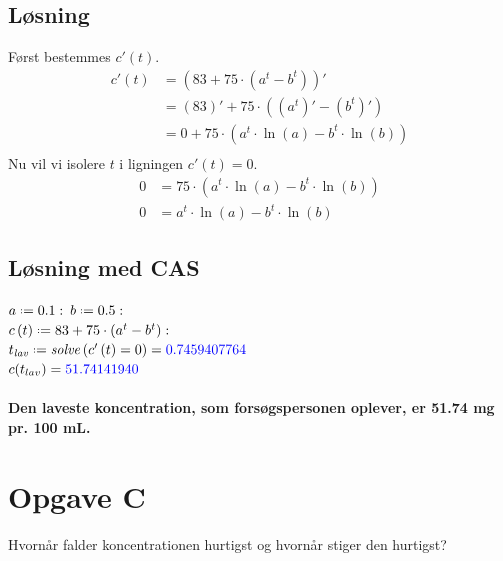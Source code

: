 \documentclass[a4paper, 11pt]{article}
\newcommand*{\defeq}{\mathrel{\vcenter{\baselineskip0.5ex \lineskiplimit0pt
                     \hbox{\scriptsize.}\hbox{\scriptsize.}}}%
                     =}
\begin{document}
\subsection*{Løsning}
Først bestemmes \(c'(t)\).\\
\begin{align*}
    c'(t)&=(83+75 \cdot (a^t-b^t))'\\
    &= (83)'+ 75 \cdot ((a^t)'-(b^t)')\\
    &= 0+ 75 \cdot (a^t\cdot \ln(a)-b^t\cdot \ln(b))\\
\end{align*}
Nu vil vi isolere \(t\) i ligningen \(c'(t)=0\).
\begin{align*}
    0 &= 75 \cdot (a^t\cdot \ln(a)-b^t\cdot \ln(b))\\
    0 &= a^t\cdot \ln(a)-b^t\cdot \ln(b)
\end{align*}
\subsection*{Løsning med CAS}
\(a \defeq 0.1\, \colon\, b \defeq 0.5 \, \colon\)\\
\(c\left(t\right)\defeq 83+75\cdot \left(a^{t}-b^{t}\right)\colon\)\\
\(t_{\mathit{lav}}\defeq \mathit{solve}\left(c'\left(t\right)=0\right)=\textcolor{blue}{0.7459407764}\)\\
\(c(t_{lav})=\textcolor{blue}{51.74141940}\)\\\\
\textbf{Den laveste koncentration, som forsøgspersonen oplever, er 51.74 mg pr. 100 mL.}
\section*{Opgave C} 
Hvornår falder koncentrationen hurtigst og hvornår stiger den hurtigst?
\end{document}
